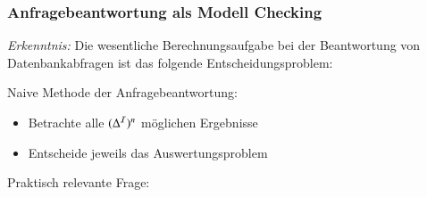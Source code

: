 \documentclass[onlymath]{beamer}
\begin{document}
\begin{frame}\frametitle{Anfragebeantwortung als Modell Checking}

\emph{Erkenntnis:} Die wesentliche Berechnungsaufgabe bei der Beantwortung von Datenbankabfragen ist das folgende Entscheidungsproblem:\bigskip

\bigskip\pause

Naive Methode der Anfragebeantwortung:
\begin{itemize}
\item Betrachte alle $(\Delta^{\mathcal{I}})^n$ möglichen Ergebnisse
\item Entscheide jeweils das Auswertungsproblem
\end{itemize}

Praktisch relevante Frage:\medskip


\end{frame}
\end{document}
